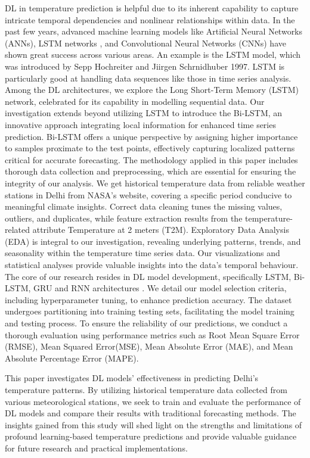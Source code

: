 DL in temperature prediction is helpful due to its inherent capability to capture intricate temporal dependencies and nonlinear relationships within data. In the past few years, advanced machine learning models like Artificial Neural Networks (ANNs), LSTM networks\cite{wang2017predrnn} \cite{chen2021study}, and Convolutional Neural Networks (CNNs)\cite{chen2021correction} have shown great success across various areas. An example is the LSTM model, which was introduced by Sepp Hochreiter and Jiirgen Schrnidhuber\cite{graves2012long} 1997. LSTM is particularly good at handling data sequences like those in time series analysis. Among the DL architectures, we explore the Long Short-Term Memory (LSTM) network, celebrated for its capability in modelling sequential data. Our investigation extends beyond utilizing LSTM to introduce the Bi-LSTM, an innovative approach integrating local information for enhanced time series prediction.
Bi-LSTM offers a unique perspective by assigning higher importance to samples proximate to the test points, effectively capturing localized patterns critical for accurate forecasting. The methodology applied in this paper includes thorough data collection and preprocessing, which are essential for ensuring the integrity of our analysis. We get historical temperature data from reliable weather stations in Delhi from NASA's website, covering a specific period conducive to meaningful climate insights. Correct data cleaning tunes the missing values, outliers, and duplicates, while feature extraction results from the temperature-related attribute Temperature at 2 meters (T2M). Exploratory Data Analysis (EDA) is integral to our investigation, revealing underlying patterns, trends, and seasonality within the temperature time series data. Our visualizations and statistical analyses provide valuable insights into the data's temporal behaviour. The core of our research resides in DL model development, specifically LSTM, Bi-LSTM, GRU and RNN architectures \cite{tabrizi2021hourly}. We detail our model selection criteria, including hyperparameter tuning, to enhance prediction accuracy. The dataset undergoes partitioning into training testing sets, facilitating the model training and testing process. To ensure the reliability of our predictions, we conduct a thorough evaluation using performance metrics such as Root Mean Square Error (RMSE), Mean Squared Error(MSE), Mean Absolute Error (MAE), and Mean Absolute Percentage Error (MAPE).


This paper investigates DL models' effectiveness in predicting Delhi's temperature patterns. By utilizing historical temperature data collected from various meteorological stations, we seek to train and evaluate the performance of DL models and compare their results with traditional forecasting methods. The insights gained from this study will shed light on the strengths and limitations of profound learning-based temperature predictions and provide valuable guidance for future research and practical implementations.
